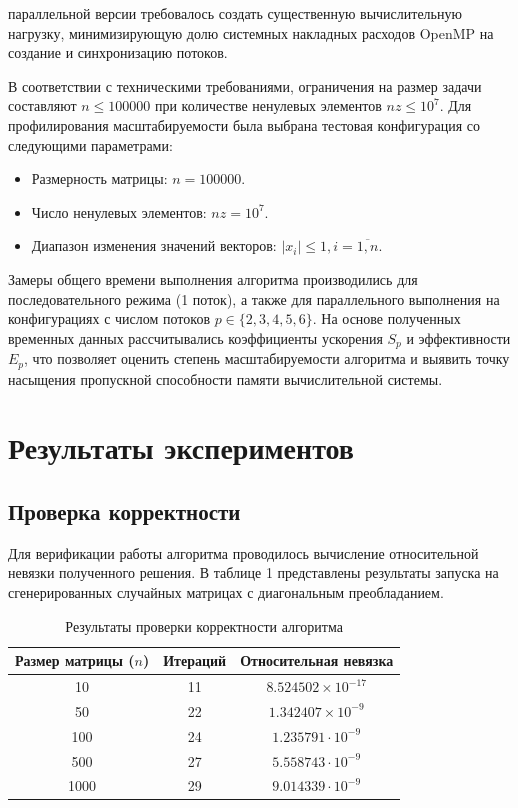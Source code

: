\documentclass[12pt, a4paper]{article}
\begin{document}
параллельной версии требовалось создать существенную вычислительную нагрузку, минимизирующую долю системных накладных расходов OpenMP на создание и синхронизацию потоков. 

В соответствии с техническими требованиями, ограничения на размер задачи составляют $n \le 100000$ при количестве ненулевых элементов $nz \le 10^7$. Для профилирования масштабируемости была выбрана тестовая конфигурация со следующими параметрами:
\begin{itemize}
    \item Размерность матрицы: $n = 100000$.
    \item Число ненулевых элементов: $nz = 10^7$.
    \item Диапазон изменения значений векторов: $|x_i| \le 1, i = \overline{1, n}$.
\end{itemize}

Замеры общего времени выполнения алгоритма производились для последовательного режима (1 поток), 
а также для параллельного выполнения на конфигурациях с числом потоков $p \in \{2, 3, 4, 5, 6\}$. 
На основе полученных временных данных рассчитывались коэффициенты ускорения $S_p$ и эффективности $E_p$,
 что позволяет оценить степень масштабируемости алгоритма и выявить точку насыщения пропускной способности 
 памяти вычислительной системы.

\section{Результаты экспериментов}

\subsection{Проверка корректности}
Для верификации работы алгоритма проводилось вычисление относительной невязки полученного решения. В таблице 1 представлены результаты запуска на сгенерированных случайных матрицах с диагональным преобладанием.

\begin{table}[h]
\centering
\begin{tabular}{|c|c|c|}
\hline
\textbf{Размер матрицы ($n$)} & \textbf{Итераций} & \textbf{Относительная невязка}  \\ 
\hline
10 & 11 & $8.524502 \times 10^{-17}$  \\
50 & 22 & $1.342407 \times 10^{-9}$ \\
100 & 24 & $1.235791 \cdot 10^{-9}$  \\
500 & 27 & $5.558743 \cdot 10^{-9}$ \\
1000 & 29 & $9.014339 \cdot 10^{-9}$  \\
\hline
\end{tabular}
\caption{Результаты проверки корректности алгоритма}
\end{table}
\end{document}
